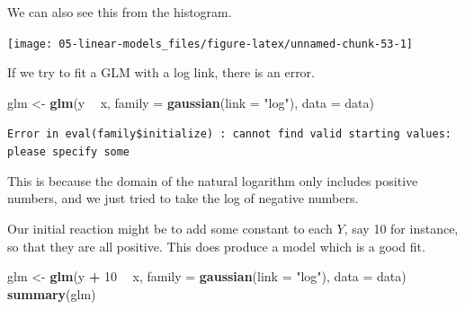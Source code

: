 \documentclass[
  openany]{book}
\newenvironment{Shaded}{\begin{snugshade}}{\end{snugshade}}
\newcommand{\DataTypeTok}[1]{\textcolor[rgb]{0.13,0.29,0.53}{#1}}
\newcommand{\DecValTok}[1]{\textcolor[rgb]{0.00,0.00,0.81}{#1}}
\newcommand{\FloatTok}[1]{\textcolor[rgb]{0.00,0.00,0.81}{#1}}
\newcommand{\KeywordTok}[1]{\textcolor[rgb]{0.13,0.29,0.53}{\textbf{#1}}}
\newcommand{\NormalTok}[1]{#1}
\newcommand{\OperatorTok}[1]{\textcolor[rgb]{0.81,0.36,0.00}{\textbf{#1}}}
\newcommand{\StringTok}[1]{\textcolor[rgb]{0.31,0.60,0.02}{#1}}
\begin{document}
We can also see this from the histogram.

\begin{Shaded}
\end{Shaded}

\begin{center}\texttt{[image: 05-linear-models\_files/figure-latex/unnamed-chunk-53-1]} \end{center}

If we try to fit a GLM with a log link, there is an error.

\begin{Shaded}
\begin{Highlighting}[]
\NormalTok{glm <-}\StringTok{ }\KeywordTok{glm}\NormalTok{(y }\OperatorTok{~}\StringTok{ }\NormalTok{x, }\DataTypeTok{family =} \KeywordTok{gaussian}\NormalTok{(}\DataTypeTok{link =} \StringTok{"log"}\NormalTok{), }\DataTypeTok{data =}\NormalTok{ data)}
\end{Highlighting}
\end{Shaded}

\texttt{Error\ in\ eval(family\$initialize)\ :\ cannot\ find\ valid\ starting\ values:\ please\ specify\ some}

This is because the domain of the natural logarithm only includes positive numbers, and we just tried to take the log of negative numbers.

Our initial reaction might be to add some constant to each \(Y\), say 10 for instance, so that they are all positive. This does produce a model which is a good fit.

\begin{Shaded}
\begin{Highlighting}[]
\NormalTok{glm <-}\StringTok{ }\KeywordTok{glm}\NormalTok{(y }\OperatorTok{+}\StringTok{ }\DecValTok{10} \OperatorTok{~}\StringTok{ }\NormalTok{x, }\DataTypeTok{family =} \KeywordTok{gaussian}\NormalTok{(}\DataTypeTok{link =} \StringTok{"log"}\NormalTok{), }\DataTypeTok{data =}\NormalTok{ data)}
\KeywordTok{summary}\NormalTok{(glm)}
\end{Highlighting}
\end{Shaded}
\end{document}
